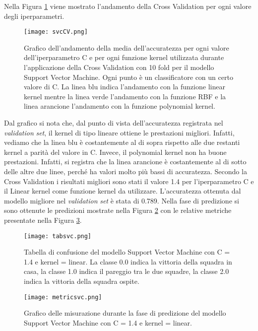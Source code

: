 Nella Figura \ref{fig:svcCV} viene mostrato l'andamento della Cross Validation per ogni valore degli iperparametri.
\begin{figure}[]
	\begin{center}
		\texttt{[image: svcCV.png]}
		\caption{Grafico dell'andamento della media dell'accuratezza per ogni valore dell'iperparametro C e per ogni funzione kernel utilizzata durante l'applicazione della Cross Validation con 10 fold per il modello Support Vector Machine. Ogni punto è un classificatore con un certo valore di C. La linea blu indica l'andamento con la funzione linear kernel mentre la linea verde l'andamento con la funzione RBF e	la linea arancione l'andamento con la funzione polynomial kernel.
		} 
		\label{fig:svcCV}
	\end{center}
\end{figure}
Dal grafico si nota che, dal punto di vista dell'accuratezza registrata nel \emph{validation} \emph{set}, il kernel di tipo lineare ottiene le prestazioni migliori. Infatti, vediamo che la linea blu è costantemente al di sopra rispetto alle due restanti kernel a parità del valore in \textsf{C}. Invece, il polynomial kernel non ha buone prestazioni. Infatti, si registra che la linea arancione è costantemente al di sotto delle altre due linee, perché ha valori molto più bassi di accuratezza. Secondo la Cross Validation i risultati migliori sono stati il valore 1.4 per l'iperparametro \textsf{C} e il Linear kernel come funzione \textsf{kernel} da utilizzare. L'accuratezza ottenuta dal modello migliore nel \emph{validation} \emph{set} è stata di 0.789. Nella fase di predizione si sono ottenute le predizioni mostrate nella Figura \ref{fig:tabsvc} con le relative metriche presentate nella Figura \ref{fig:svcmetrics}.
\begin{figure}[]
	\begin{center}
		\texttt{[image: tabsvc.png]}
		\caption{Tabella di confusione del modello Support Vector Machine con \textsf{C} = 1.4 e \textsf{kernel} = linear. La classe 0.0 indica la vittoria della squadra in casa, la classe 1.0 indica il pareggio tra le due squadre, la classe 2.0 indica la vittoria della squadra ospite.
		} 
		\label{fig:tabsvc}
	\end{center}
\end{figure}
\begin{figure}[]
	\begin{center}
		\texttt{[image: metricsvc.png]}
		\caption{Grafico delle misurazione durante la fase di predizione del modello Support Vector Machine con \textsf{C} = 1.4 e \textsf{kernel} = linear.
		} 
		\label{fig:svcmetrics}
	\end{center}
\end{figure}
